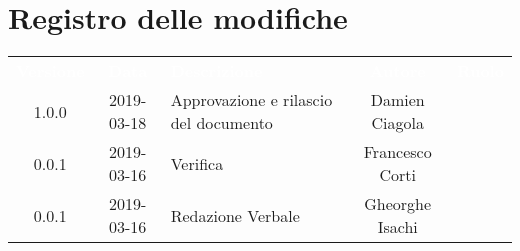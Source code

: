 \section*{Registro delle modifiche}
{
	\renewcommand{\arraystretch}{1.5}
	\centering
	\begin{longtable}{ c c  C{4cm}  c  c }
		
		\textcolor{white}{\textbf{Versione}} & \textcolor{white}{\textbf{Data}} & \textcolor{white}{\textbf{Descrizione}} & \textcolor{white}{\textbf{Autore}} & \textcolor{white}{\textbf{Ruolo}}\\
		
		1.0.0 & 2019-03-18 & Approvazione e rilascio del documento & Damien Ciagola & \Res{}\\
		
		0.0.1 & 2019-03-16 & Verifica & Francesco Corti & \ver{} \\
	
		0.0.1 & 2019-03-16 & Redazione Verbale & Gheorghe Isachi & \reda{}\\
		
	\end{longtable}

}